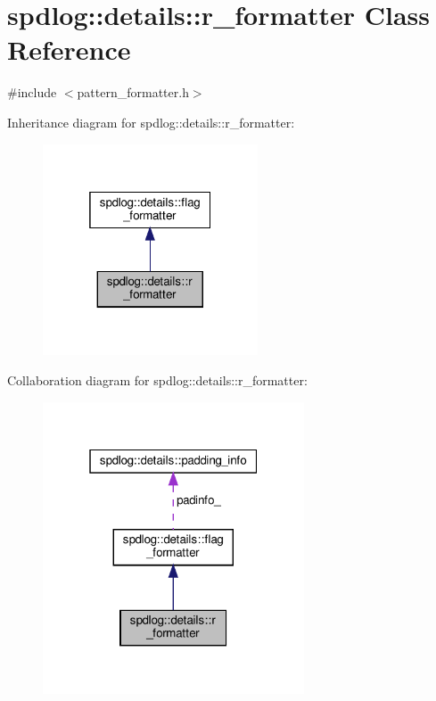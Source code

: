 \hypertarget{classspdlog_1_1details_1_1r__formatter}{}\section{spdlog\+:\+:details\+:\+:r\+\_\+formatter Class Reference}
\label{classspdlog_1_1details_1_1r__formatter}


{\ttfamily \#include $<$pattern\+\_\+formatter.\+h$>$}



Inheritance diagram for spdlog\+:\+:details\+:\+:r\+\_\+formatter\+:
\nopagebreak
\begin{figure}[H]
\begin{center}
\leavevmode
\includegraphics[width=181pt]{classspdlog_1_1details_1_1r__formatter__inherit__graph}
\end{center}
\end{figure}


Collaboration diagram for spdlog\+:\+:details\+:\+:r\+\_\+formatter\+:
\nopagebreak
\begin{figure}[H]
\begin{center}
\leavevmode
\includegraphics[width=220pt]{classspdlog_1_1details_1_1r__formatter__coll__graph}
\end{center}
\end{figure}
